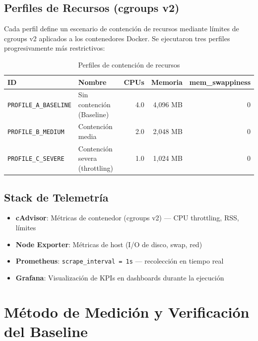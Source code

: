 \documentclass[12pt,a4paper]{article}
\newcommand{\profileA}{\texttt{PROFILE\_A\_BASELINE}}
\newcommand{\profileB}{\texttt{PROFILE\_B\_MEDIUM}}
\newcommand{\profileC}{\texttt{PROFILE\_C\_SEVERE}}
\begin{document}
\subsection{Perfiles de Recursos (cgroups v2)}

Cada perfil define un escenario de contención de recursos mediante límites de cgroups v2 aplicados a los contenedores Docker. Se ejecutaron tres perfiles progresivamente más restrictivos:

\begin{table}[H]
\centering
\caption{Perfiles de contención de recursos}
\begin{tabular}{llrrr}
\toprule
\textbf{ID} & \textbf{Nombre} & \textbf{CPUs} & \textbf{Memoria} & \textbf{mem\_swappiness} \\
\midrule
\rowcolor{okbg}
\profileA{} & Sin contención (Baseline)      & 4.0 & 4{,}096 MB & 0 \\
\rowcolor{warnbg}
\profileB{} & Contención media               & 2.0 & 2{,}048 MB & 0 \\
\rowcolor{errbg}
\profileC{} & Contención severa (throttling) & 1.0 & 1{,}024 MB & 0 \\
\bottomrule
\end{tabular}
\end{table}

\subsection{Stack de Telemetría}

\begin{itemize}
  \item \textbf{cAdvisor}: Métricas de contenedor (cgroups v2) — CPU throttling, RSS, límites
  \item \textbf{Node Exporter}: Métricas de host (I/O de disco, swap, red)
  \item \textbf{Prometheus}: \texttt{scrape\_interval = 1s} — recolección en tiempo real
  \item \textbf{Grafana}: Visualización de KPIs en dashboards durante la ejecución
\end{itemize}

\section{Método de Medición y Verificación del Baseline}
\end{document}

